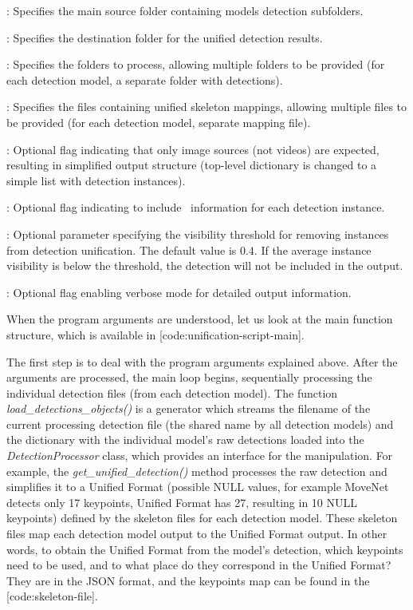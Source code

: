 \startitemize
 \item {}: Specifies the main source folder containing models detection subfolders.
 \item {}: Specifies the destination folder for the unified detection results.
 \item {}: Specifies the folders to process, allowing multiple folders to be provided (for each detection model, a separate folder with detections).
 \item {}: Specifies the files containing unified skeleton mappings, allowing multiple files to be provided (for each detection model, separate mapping file).
 \item {}: Optional flag indicating that only image sour\-ces (not videos) are expected, resulting in simplified output structure (top-level dictionary is changed to a simple list with detection instances).
 \item {}: Optional flag indicating to include \BBOX\ information for each detection instance.
 \item {}: Optional parameter specifying the visibility threshold for removing instances from detection unification. The default value is 0.4. If the average instance visibility is below the threshold, the detection will not be included in the output.
 \item {}: Optional flag enabling verbose mode for detailed output information.
\stopitemize

When the program arguments are understood, let us look at the main function structure, which is available in [code:unification-script-main].


The first step is to deal with the program arguments explained above. After the arguments are processed, the main loop begins, sequentially processing the individual detection files (from each detection model). The function {\it load_detections_objects()} is a generator which streams the filename of the current processing detection file (the shared name by all detection models) and the dictionary with the individual model's raw detections loaded into the {\it DetectionProcessor} class, which provides an interface for the manipulation. For example, the {\it get_unified_detection()} method processes the raw detection and simplifies it to a Unified Format (possible NULL values, for example MoveNet detects only 17 keypoints, Unified Format has 27, resulting in 10 NULL keypoints) defined by the skeleton files for each detection model. These skeleton files map each detection model output to the Unified Format output. In other words, to obtain the Unified Format from the model's detection, which keypoints need to be used, and to what place do they correspond in the Unified Format? They are in the JSON format, and the keypoints map can be found in the [code:skeleton-file].

